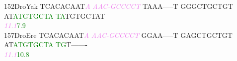 \documentclass[11pt,twoside,reqno,a4paper]{article}
\begin{document}
{152\hspace*{1\charwidth}DroYak	TCACACAAT\textit{\textcolor{violet}{A}}	\textit{\textcolor{violet}{A}}\textit{\textcolor{violet}{A}}\textit{\textcolor{violet}{C}}\textit{\textcolor{violet}{-}}\textit{\textcolor{violet}{G}}\textit{\textcolor{violet}{C}}\textit{\textcolor{violet}{C}}\textit{\textcolor{violet}{C}}\textit{\textcolor{violet}{C}}\textit{\textcolor{violet}{T}}	TAAA-----T	GGGCTGCTGT	AT\textcolor{green}{A}\textcolor{green}{T}\textcolor{green}{G}\textcolor{green}{T}\textcolor{green}{G}\textcolor{green}{C}\textcolor{green}{T}\textcolor{green}{A}	\textcolor{green}{T}\textcolor{green}{A}TGTGCTAT	\\
\hspace*{4\charwidth}\hspace*{7\charwidth}\hspace*{9\charwidth}\textit{\textcolor{violet}{11.1}}\hspace*{1\charwidth}\hspace*{1\charwidth}\hspace*{1\charwidth}\hspace*{1\charwidth}\hspace*{29\charwidth}\textcolor{green}{7.9}\hspace*{1\charwidth}\hspace*{1\charwidth}\\
157\hspace*{1\charwidth}DroEre	TCACACAAT\textit{\textcolor{violet}{A}}	\textit{\textcolor{violet}{A}}\textit{\textcolor{violet}{A}}\textit{\textcolor{violet}{C}}\textit{\textcolor{violet}{-}}\textit{\textcolor{violet}{G}}\textit{\textcolor{violet}{C}}\textit{\textcolor{violet}{C}}\textit{\textcolor{violet}{C}}\textit{\textcolor{violet}{C}}\textit{\textcolor{violet}{T}}	GGAA-----T	GAGCTGCTGT	AT\textcolor{green}{A}\textcolor{green}{T}\textcolor{green}{G}\textcolor{green}{T}\textcolor{green}{G}\textcolor{green}{C}\textcolor{green}{T}\textcolor{green}{A}	\textcolor{green}{T}\textcolor{green}{G}T-------	\\
\hspace*{4\charwidth}\hspace*{7\charwidth}\hspace*{9\charwidth}\textit{\textcolor{violet}{11.1}}\hspace*{1\charwidth}\hspace*{1\charwidth}\hspace*{1\charwidth}\hspace*{1\charwidth}\hspace*{29\charwidth}\textcolor{green}{10.8}\hspace*{1\charwidth}\hspace*{1\charwidth}\\
}
\end{document}
